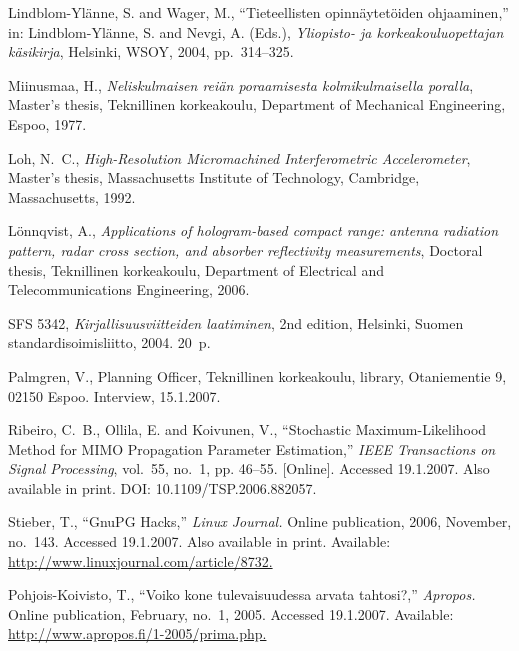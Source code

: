 \documentclass[english, 12pt, a4paper, biz, utf8, a-2b, online]{aaltothesis}
\begin{document}
\begin{thebibliography}{99}
   Lindblom-Ylänne, S. and Wager, M.,
    ``\foreignlanguage{finnish}{Tieteellisten opinnäytetöiden ohjaaminen},'' in:
    Lindblom-Ylänne, S. and Nevgi, A. (Eds.), \textit{Yliopisto- ja
    korkeakouluopettajan käsikirja}, Helsinki, WSOY, 2004, pp.\ 314--325.
 
   Miinusmaa, H., \textit{Neliskulmaisen reiän poraamisesta
	kolmikulmaisella poralla}, Master's thesis, Teknillinen korkeakoulu,
	Department of Mechanical Engineering, Espoo, 1977.
 
   Loh, N.\ C., \textit{High-Resolution Micromachined 
  	Interferometric Accelerometer}, Master's thesis, Massachusetts Institute of 
    Technology, Cambridge, Massachusetts, 1992.

   Lönnqvist, A., \textit{Applications of hologram-based 
  	compact range: antenna radiation pattern, radar cross section, and absorber 
  	reflectivity measurements}, Doctoral thesis, Teknillinen korkeakoulu, 
    Department of Electrical and Telecommunications Engineering, 2006.

   SFS 5342, \textit{Kirjallisuusviitteiden laatiminen}, 2nd 
    edition, Helsinki, Suomen standardisoimisliitto, 2004. 20~p.

   Palmgren, V., Planning Officer, Teknillinen korkeakoulu, 
    library, Otaniementie 9, 02150 Espoo. Interview, 15.1.2007.

   Ribeiro, C.\ B., Ollila, E. and Koivunen, V., ``Stochastic 
	Maximum-Likelihood Method for MIMO Propagation Parameter Estimation,'' 
	\textit{IEEE Transactions on Signal Processing}, vol.~55, no.~1, pp. 46--55.
	[Online]. Accessed 19.1.2007. Also available in print.
	DOI: 10.1109/TSP.2006.882057.

   Stieber, T., ``GnuPG Hacks,'' \textit{Linux Journal.} Online
	publication, 2006, November, no.~143. Accessed 19.1.2007. Also available in 
	print. Available: \url{http://www.linuxjournal.com/article/8732.}

   Pohjois-Koivisto, T., ``\foreignlanguage{finnish}{Voiko kone 
  	tulevaisuudessa arvata tahtosi?,}'' \textit{Apropos.} Online publication, 
	February, no.~1, 2005. Accessed 19.1.2007. Available:
	\url{http://www.apropos.fi/1-2005/prima.php.}


\end{thebibliography}
\end{document}
